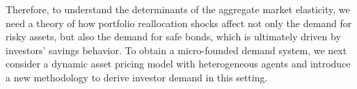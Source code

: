 Therefore, to understand the determinants of the aggregate market elasticity, we need a theory of how portfolio reallocation shocks affect not only the demand for risky assets, but also the demand for safe bonds, which is ultimately driven by investors' savings behavior. 
To obtain a micro-founded demand system, we next consider a dynamic asset pricing model with heterogeneous agents and introduce a new methodology to derive investor demand in this setting.









